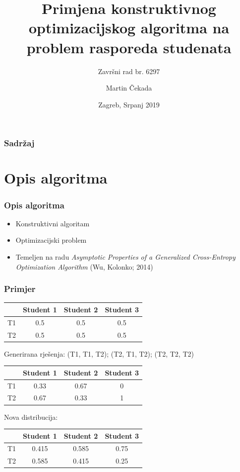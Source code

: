 \documentclass{beamer}
\title[Obrana završnog rada] %
{Primjena konstruktivnog optimizacijskog algoritma na problem
rasporeda studenata}
\subtitle{Završni rad br. 6297}
\author[Martin Čekada] %
{Martin Čekada}
\institute[FER] %
{
  Sveučilište u Zagrebu

  Fakultet elektrotehnike i računarstva
}
\date[Zagreb, Srpanj 2019] %
{Zagreb, Srpanj 2019}
\begin{document}
\frame{\titlepage}

\begin{frame}
\frametitle{Sadržaj}
\tableofcontents
\end{frame}

\section{Opis algoritma}
\begin{frame}
\frametitle{Opis algoritma}
\begin{itemize}
  \item Konstruktivni algoritam
  \item Optimizacijski problem
  \item Temeljen na radu \textit{Asymptotic Properties of a Generalized Cross-Entropy Optimization Algorithm} (Wu, Kolonko; 2014)
  \end{itemize}
\end{frame}


\begin{frame}
\frametitle{Primjer}
  \begin{table}
    \centering
    \begin{tabular}{c | c | c | c }
       & Student 1 & Student 2 & Student 3  \\ \hline
      T1 & 0.5 & 0.5 & 0.5 \\ \hline
      T2 & 0.5 & 0.5 & 0.5
    \end{tabular}
  \end{table}


  Generirana rješenja: (T1, T1, T2); (T2, T1, T2); (T2, T2, T2)


  \begin{table}
    \centering
    \begin{tabular}{c | c | c | c }
       & Student 1 & Student 2 & Student 3  \\ \hline
      T1 & 0.33 & 0.67 & 0 \\ \hline
      T2 & 0.67 & 0.33 & 1
    \end{tabular}
  \end{table}

  Nova distribucija:
  \begin{table}
    \centering
    \begin{tabular}{c | c | c | c }
       & Student 1 & Student 2 & Student 3  \\ \hline
      T1 & 0.415 & 0.585 & 0.75 \\ \hline
      T2 & 0.585 & 0.415 & 0.25
    \end{tabular}
  \end{table}
\end{frame}
\end{document}
